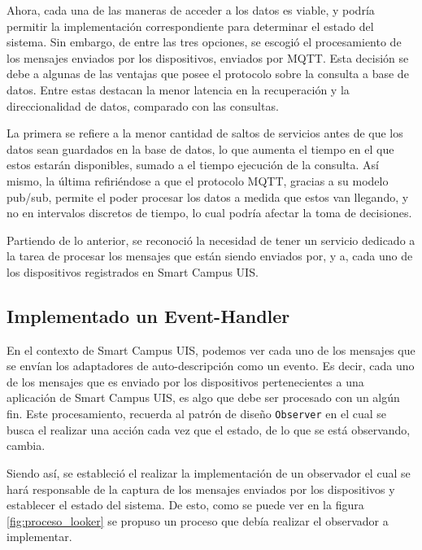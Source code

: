 Ahora, cada una de las maneras de acceder a los datos es viable, y podría permitir la implementación correspondiente para determinar el estado del sistema. Sin embargo, de entre las tres opciones, se escogió el procesamiento de los mensajes enviados por los dispositivos, enviados por MQTT. Esta decisión se debe a algunas de las ventajas que posee el protocolo sobre la consulta a base de datos. Entre estas destacan la menor latencia en la recuperación y la direccionalidad de datos, comparado con las consultas. 

La primera se refiere a la menor cantidad de saltos de servicios antes de que los datos sean guardados en la base de datos, lo que aumenta el tiempo en el que estos estarán disponibles, sumado a el tiempo ejecución de la consulta. Así mismo, la última refiriéndose a que el protocolo MQTT, gracias a su modelo pub/sub, permite el poder procesar los datos a medida que estos van llegando, y no en intervalos discretos de tiempo, lo cual podría afectar la toma de decisiones.

Partiendo de lo anterior, se reconoció la necesidad de tener un servicio dedicado a la tarea de procesar los mensajes que están siendo enviados por, y a, cada uno de los dispositivos registrados en Smart Campus UIS. 

\subsection{Implementado un Event-Handler}

En el contexto de Smart Campus UIS, podemos ver cada uno de los mensajes que se envían los adaptadores de auto-descripción como un evento. Es decir, cada uno de los mensajes que es enviado por los dispositivos pertenecientes a una aplicación de Smart Campus UIS, es algo que debe ser procesado con un algún fin. Este procesamiento, recuerda al patrón de diseño \texttt{Observer} en el cual se busca el realizar una acción cada vez que el estado, de lo que se está observando, cambia.

Siendo así, se estableció el realizar la implementación de un observador el cual se hará responsable de la captura de los mensajes enviados por los dispositivos y establecer el estado del sistema. De esto, como se puede ver en la figura \ref{fig:proceso_looker} se propuso un proceso que debía realizar el observador a implementar.


